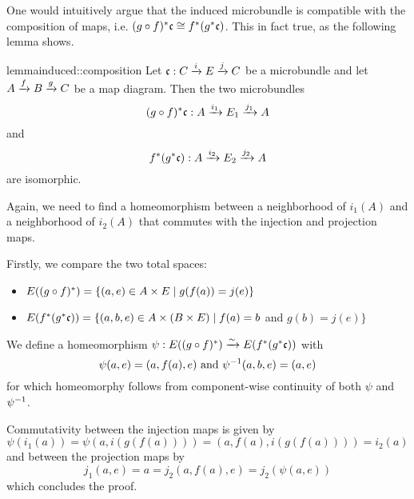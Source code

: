 \begin{myparagraph}
    One would intuitively argue that the induced microbundle is compatible
    with the composition of maps, i.e.
    $\ind{(g \circ f)}\bc \cong \ind{f}(\ind{g}\bc)$.
    This in fact true, as the following lemma shows.
\end{myparagraph}

\begin{mystatement}{lemma}{induced::composition}
    Let $\bundledef{\bc}{C}{E}{i}{j}$ be a microbundle and let $A \xto{f} B \xto{g} C$ be a map diagram.
    Then the two microbundles
    \[ \bundledef{\ind{(g \circ f)}\bc}{A}{E_1}{i_1}{j_1} \]
    and
    \[ \bundledef{\ind{f}(\ind{g}\bc)}{A}{E_2}{i_2}{j_2} \]
    are isomorphic.
\end{mystatement}

\begin{myproof}
    Again, we need to find a homeomorphism between a neighborhood of $i_1(A)$ and a neighborhood of $i_2(A)$
    that commutes with the injection and projection maps.
    
    Firstly, we compare the two total spaces:
    \begin{itemize}
        \item $E(\ind{(g \circ f)}) = \{ (a, e) \in A \cross E \mid g(f(a)) = j(e)\}$ 
        \item $E(\ind{f}(\ind{g}\bc)) = \{ (a, b, e) \in A \cross (B \cross E) \mid f(a) = b$ and $ g(b) = j(e) \}$
    \end{itemize}
    We define a homeomorphism $\psi: E(\ind{(g \circ f)}) \isomto E(\ind{f}(\ind{g}\bc))$ with
    \[ \psi(a, e) = (a, f(a), e) \tand \inv{\psi}(a, b, e) = (a, e) \]
    for which homeomorphy follows from component-wise
    continuity of both $\psi$ and $\inv{\psi}$.

    Commutativity between the injection maps is given by
    \[ \psi(i_1(a)) = \psi(a, i(g(f(a)))) = (a, f(a), i(g(f(a)))) = i_2(a) \]
    and between the projection maps by
    \[ j_1(a, e) = a = j_2(a, f(a), e) = j_2(\psi(a, e)) \]
    which concludes the proof.
\end{myproof}